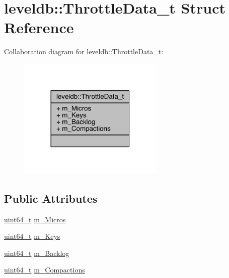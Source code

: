\hypertarget{structleveldb_1_1_throttle_data__t}{}\section{leveldb\+:\+:Throttle\+Data\+\_\+t Struct Reference}
\label{structleveldb_1_1_throttle_data__t}


Collaboration diagram for leveldb\+:\+:Throttle\+Data\+\_\+t\+:\nopagebreak
\begin{figure}[H]
\begin{center}
\leavevmode
\includegraphics[width=197pt]{structleveldb_1_1_throttle_data__t__coll__graph}
\end{center}
\end{figure}
\subsection*{Public Attributes}
\begin{DoxyCompactItemize}
\item 
\hyperlink{stdint_8h_aaa5d1cd013383c889537491c3cfd9aad}{uint64\+\_\+t} \hyperlink{structleveldb_1_1_throttle_data__t_ade5e9876a9b558bdf7b4bea98416afa4}{m\+\_\+\+Micros}
\item 
\hyperlink{stdint_8h_aaa5d1cd013383c889537491c3cfd9aad}{uint64\+\_\+t} \hyperlink{structleveldb_1_1_throttle_data__t_a1e18042eb518407a28a142cd36680e79}{m\+\_\+\+Keys}
\item 
\hyperlink{stdint_8h_aaa5d1cd013383c889537491c3cfd9aad}{uint64\+\_\+t} \hyperlink{structleveldb_1_1_throttle_data__t_a1cccb449d7d892dfa2cd50ad1718f1a4}{m\+\_\+\+Backlog}
\item 
\hyperlink{stdint_8h_aaa5d1cd013383c889537491c3cfd9aad}{uint64\+\_\+t} \hyperlink{structleveldb_1_1_throttle_data__t_a3e1f7052c63af728e7a2227965170218}{m\+\_\+\+Compactions}
\end{DoxyCompactItemize}


